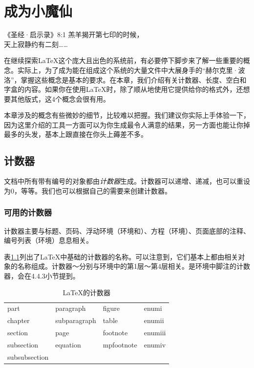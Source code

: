 \chapter{成为小魔仙}

\begin{epigraphe}{《圣经·启示录》8:1}
    羔羊揭开第七印的时候，\\天上寂静约有二刻……
\end{epigraphe}

在继续探索\LaTeX 这个庞大且出色的系统前，有必要停下脚步来了解一些重要的概念。实际上，为了成为能在组成这个系统的大量文件中大展身手的“赫尔克里·波洛”，掌握这些概念是基本的要求。在本章，我们介绍有关计数器、长度、空白和字盒的内容。如果你在使用\LaTeX 时，除了顺从地使用它提供给你的格式外，还想要其他版式，这4个概念会很有用。

\begin{exclamation}
    本章涉及的概念有些微妙的细节，比较难以把握。我们建议你实际上手体验一下，因为这里介绍的工具一方面可以为你生成最令人满意的结果，另一方面也能让你掉最多的头发，基本上跟直接在你头上薅差不多。
\end{exclamation}
\section{计数器}

文档中所有带有编号的对象都由\emph{计数器}生成。计数器可以递增、递减，也可以重设为0，等等。我们也可以根据自己的需要来创建计数器。

\subsection{可用的计数器}

计数器主要与标题、页码、浮动环境（环境和）、方程（环境）、页面底部的注释、编号列表（环境）息息相关。

表\ref{tab:4.1}列出了\LaTeX 中基础的计数器的名称。可以注意到，它们基本上都由相关对象的名称组成。计数器～分别与环境中的第1层～第4层相关。是环境中脚注的计数器，会在4.4.3小节提到。

\begin{table}
  \centering
  \ttfamily
  \begin{tabular}{|l|l|l|l|}
    \hline
    part       & paragraph    & figure     & enumi\\
    chapter    & subparagraph & table      & enumii\\
    section    & page         & footnote   & enumiii\\
    subsection & equation     & mpfootnote & enumiv\\
    subsubsection &&&\\
    \hline
  \end{tabular}
  \caption{\LaTeX 的计数器}
  \label{tab:4.1}
\end{table}

